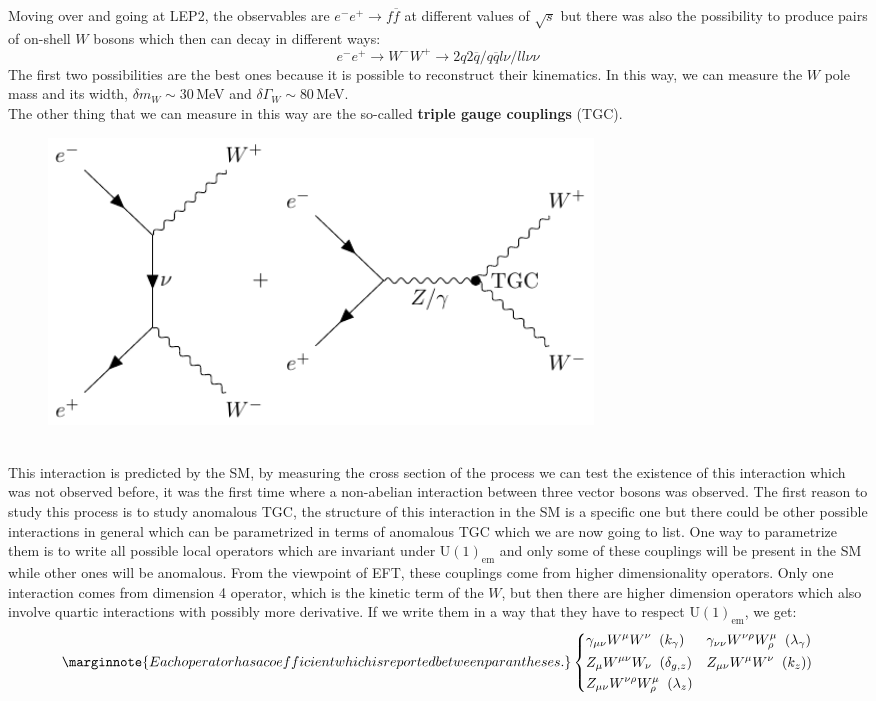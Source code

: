 \documentclass[../main.tex]{subfiles}
\begin{document}
Moving over and going at LEP2, the observables are $e^-e^+\to f\overline{f}$ at different values of $\sqrt{s}$ but there was also the possibility to produce pairs of on-shell $W$ bosons which then can decay in different ways:
\[
e^-e^+\to W^-W^+\to2q2\overline{q}/q\overline{q}l\nu/ll\nu\nu
\]
The first two possibilities are the best ones because it is possible to reconstruct their kinematics. In this way, we can measure the $W$ pole mass and its width,
$\delta m_W\sim30$\,MeV and $\delta\Gamma_W\sim80$\,MeV.\\
The other thing that we can measure in this way are the so-called \textbf{triple gauge couplings} (TGC).
\begin{figure}[h]
    \centering
    \includegraphics[width=0.7\textwidth]{Images/TGC.pdf}
    \caption*{}
\end{figure}\\
This interaction is predicted by the SM, by measuring the cross section of the process we can test the existence of this interaction which was not observed before, it was the first time where a non-abelian interaction between three vector bosons was observed. The first reason to study this process is to study anomalous TGC, the structure of this interaction in the SM is a specific one but there could be other possible interactions in general which can be parametrized in terms of anomalous TGC which we are now going to list. One way to parametrize them is to write all possible local operators which are invariant under U$(1)_{\text{em}}$ and only some of these couplings will be present in the SM while other ones will be anomalous. From the viewpoint of EFT, these couplings come from higher dimensionality operators. Only one interaction comes from dimension 4 operator, which is the kinetic term of the $W$, but then there are higher dimension operators which also involve quartic interactions with possibly more derivative. If we write them in a way that they have to respect U$(1)_{\text{em}}$, we get:
\[
\marginnote{Each operator has a coefficient which is reported between parantheses.}
\left\{
\begin{aligned}
&\gamma_{\mu\nu}W^\mu W^\nu\;\; (k_\gamma) && \gamma_{\nu\nu}W^{\nu\rho}W^\mu_\rho\;\; (\lambda_\gamma)\\
&Z_\mu W^{\mu\nu}W_\nu\;\; (\delta_{g,z}) && Z_{\mu\nu}W^\mu W^\nu\;\; (k_z))\\
&Z_{\mu\nu}W^{\nu\rho}W_\rho^\mu\;\; (\lambda_z)
\end{aligned}
\right.
\]
\end{document}
